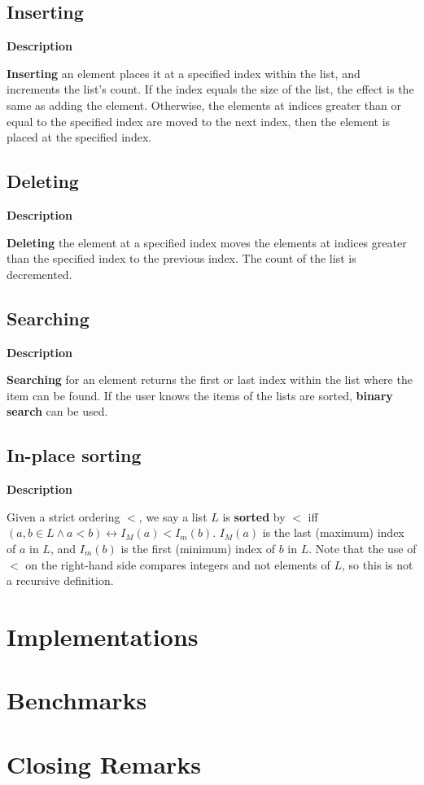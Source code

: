 \documentclass{article}
\newcommand{\descriptn}{\textbf{Description}}
\newcommand{\listname}{L}
\begin{document}
	\subsection{Inserting}
	
	\descriptn
	
	\textbf{Inserting} an element places it at a specified index within the list, and increments the list's count. If the index equals the size of the list, the effect is the same as adding the element. Otherwise, the elements at indices greater than or equal to the specified index are moved to the next index, then the element is placed at the specified index.
	
	\subsection{Deleting}
	
	\descriptn
	
	\textbf{Deleting} the element at a specified index moves the elements at indices greater than the specified index to the previous index. The count of the list is decremented.
	
	\subsection{Searching}
	
	\descriptn
	
	\textbf{Searching} for an element returns the first or last index within the list where the item can be found. If the user knows the items of the lists are sorted, \textbf{binary search} can be used.
	
	\subsection{In-place sorting}
	
	\descriptn
	
	Given a strict ordering $<$, we say a list $\listname$ is \textbf{sorted} by $<$ iff $\left(a, b \in \listname \land a < b\right) \leftrightarrow I_M(a) < I_m(b)$. $I_M(a)$ is the last (maximum) index of $a$ in $L$, and $I_m(b)$ is the first (minimum) index of $b$ in $L$. Note that the use of $<$ on the right-hand side compares integers and not elements of $L$, so this is not a recursive definition.
	
	\section{Implementations}
	
	\section{Benchmarks}
	
	\section{Closing Remarks}
\end{document}
